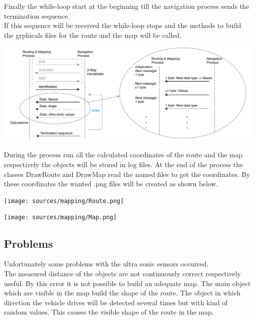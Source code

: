 Finally the while-loop start at the beginning till the navigation process sends the termination sequence.\\
If this sequence will be received the while-loop stops and the methods to build the grphicals files for the route and the map will be called.

\begin{center}
	\includegraphics[scale=0.7]{sources/mapping/communication.pdf}
\end{center}


During the process run all the calculated coordinates of the route and the map respectively the objects will be stored in log files. At the end of the process the classes DrawRoute and DrawMap read the named files to get the coordinates. By these coordinates the wanted .png files will be created as shown below.

\begin{minipage}{0.5\textwidth}
\begin{center}
	\texttt{[image: sources/mapping/Route.png]}
\end{center}
\end{minipage}
\begin{minipage}{0.5\textwidth}
\begin{center}
	\texttt{[image: sources/mapping/Map.png]}
\end{center}
\end{minipage}


\subsection{Problems}

Unfortunately some problems with the ultra sonic sensors occurred.\\
The measured distance of the objects are not continuously correct respectively useful. By this error it is not possible to build an adequate map. The main object which are visible in the map build the shape of the route. The object in which direction the vehicle drives will be detected several times but with kind of random values. This causes the visible shape of the route in the map.